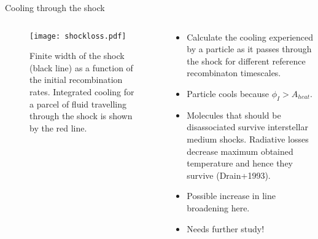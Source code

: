 \documentclass[10pt,aspectratio=169,usenames,dvipsnames]{beamer}
\begin{document}
\begin{frame}{Cooling through the shock}
\begin{columns}
\begin{column}{0.5\textwidth}
\begin{figure}
    \centering
    \texttt{[image: shockloss.pdf]}
    \caption{Finite width of the shock (black line) as a function of the initial recombination rates. Integrated cooling for a parcel of fluid travelling through the shock is shown by the red line.}
    \label{fig:shockwidthsw}
\end{figure}
\end{column}
\begin{column}{0.42\textwidth}
\begin{itemize}
    \item Calculate the cooling experienced by a particle as it passes through the shock for different reference recombinaton timescales.
    \item Particle cools because $\phi _{I} > A_{heat}$.
    \item Molecules that should be disassociated survive interstellar medium shocks. Radiative losses decrease maximum obtained temperature and hence they survive (Drain+1993).
    \item Possible increase in line broadening here.
    \item Needs further study!
\end{itemize}
\end{column}
\end{columns}
\end{frame}

\end{document}
